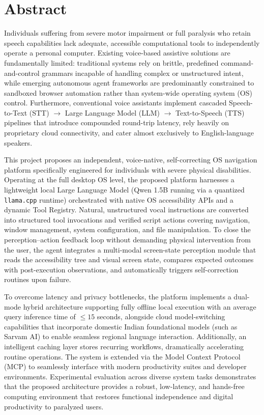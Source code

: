 \chapter*{Abstract}%
%

Individuals suffering from severe motor impairment or full paralysis who retain speech capabilities lack adequate, accessible computational tools to independently operate a personal computer. Existing voice-based assistive solutions are fundamentally limited: traditional systems rely on brittle, predefined command-and-control grammars incapable of handling complex or unstructured intent, while emerging autonomous agent frameworks are predominantly constrained to sandboxed browser automation rather than system-wide operating system (OS) control. Furthermore, conventional voice assistants implement cascaded Speech-to-Text (STT) $\rightarrow$ Large Language Model (LLM) $\rightarrow$ Text-to-Speech (TTS) pipelines that introduce compounded round-trip latency, rely heavily on proprietary cloud connectivity, and cater almost exclusively to English-language speakers.

This project proposes an independent, voice-native, self-correcting OS navigation platform specifically engineered for individuals with severe physical disabilities. Operating at the full desktop OS level, the proposed platform harnesses a lightweight local Large Language Model (Qwen 1.5B running via a quantized \texttt{llama.cpp} runtime) orchestrated with native OS accessibility APIs and a dynamic Tool Registry. Natural, unstructured vocal instructions are converted into structured tool invocations and verified script actions covering navigation, window management, system configuration, and file manipulation. To close the perception--action feedback loop without demanding physical intervention from the user, the agent integrates a multi-modal screen-state perception module that reads the accessibility tree and visual screen state, compares expected outcomes with post-execution observations, and automatically triggers self-correction routines upon failure. 

To overcome latency and privacy bottlenecks, the platform implements a dual-mode hybrid architecture supporting fully offline local execution with an average query inference time of $\le 15$ seconds, alongside cloud model-switching capabilities that incorporate domestic Indian foundational models (such as Sarvam AI) to enable seamless regional language interaction. Additionally, an intelligent caching layer stores recurring workflows, dramatically accelerating routine operations. The system is extended via the Model Context Protocol (MCP) to seamlessly interface with modern productivity suites and developer environments. Experimental evaluation across diverse system tasks demonstrates that the proposed architecture provides a robust, low-latency, and hands-free computing environment that restores functional independence and digital productivity to paralyzed users.

\thispagestyle{plain}
